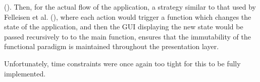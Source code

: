 (\cite[][Ch.~8,~Location~3943]{nikolov2016scala}). Then, for the actual flow of
the application, a strategy similar to that used by Felleisen et al.
(\citeyear[][Ch.~5]{felleisen2013realm}), where each action would trigger a
function which changes the state of the application, and then the GUI
displaying the new state would be passed recursively to to the main function,
ensures that the immutability of the functional paradigm is maintained
throughout the presentation layer.

Unfortunately, time constraints were once again too tight for this to be fully
implemented.
